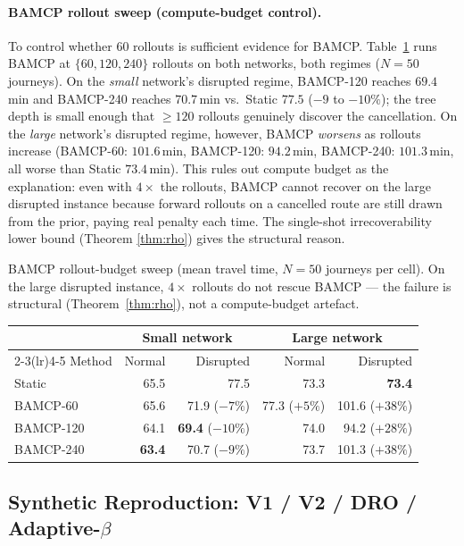 \documentclass[opre,dblanonrev]{informs4}
\begin{document}
\begin{APPENDICES}
\paragraph{BAMCP rollout sweep (compute-budget control).} To
control whether $60$ rollouts is sufficient evidence for
BAMCP. Table~\ref{tab:bamcp_sweep} runs BAMCP at $\{60, 120, 240\}$
rollouts on both networks, both regimes ($N{=}50$ journeys). On the
\emph{small} network's disrupted regime, BAMCP-120 reaches $69.4$\,min
and BAMCP-240 reaches $70.7$\,min vs.\ Static $77.5$ ($-9$ to $-10\%$);
the tree depth is small enough that $\geq 120$ rollouts genuinely
discover the cancellation. On the \emph{large} network's disrupted
regime, however, BAMCP \emph{worsens} as rollouts increase (BAMCP-60:
$101.6$\,min, BAMCP-120: $94.2$\,min, BAMCP-240: $101.3$\,min, all
worse than Static $73.4$\,min). This rules out compute budget as the
explanation: even with $4{\times}$ the rollouts, BAMCP cannot recover
on the large disrupted instance because forward rollouts on a
cancelled route are still drawn from the prior, paying real penalty
each time. The single-shot irrecoverability lower bound (Theorem
\ref{thm:rho}) gives the structural reason.

\begin{table}
\TABLE
{BAMCP rollout-budget sweep (mean travel time, $N{=}50$ journeys
per cell). On the large disrupted instance, $4{\times}$ rollouts do
not rescue BAMCP --- the failure is structural (Theorem~\ref{thm:rho}),
not a compute-budget artefact.\label{tab:bamcp_sweep}}
{\begin{tabular}{l rrrr}
\toprule
                 & \multicolumn{2}{c}{Small network} & \multicolumn{2}{c}{Large network} \\
\cmidrule(lr){2-3}\cmidrule(lr){4-5}
Method           & Normal & Disrupted & Normal & Disrupted \\
\midrule
Static           & 65.5 & 77.5 & 73.3 & \textbf{73.4} \\
BAMCP-60         & 65.6 & 71.9 ($-7\%$) & 77.3 ($+5\%$) & 101.6 ($+38\%$) \\
BAMCP-120        & 64.1 & \textbf{69.4} ($-10\%$) & 74.0 & 94.2 ($+28\%$) \\
BAMCP-240        & \textbf{63.4} & 70.7 ($-9\%$) & 73.7 & 101.3 ($+38\%$) \\
\bottomrule
\end{tabular}}
{}
\end{table}

\subsection{Synthetic Reproduction: V1 / V2 / DRO / Adaptive-$\beta$}
\label{ec:synth-repro}


\end{APPENDICES}
\end{document}

